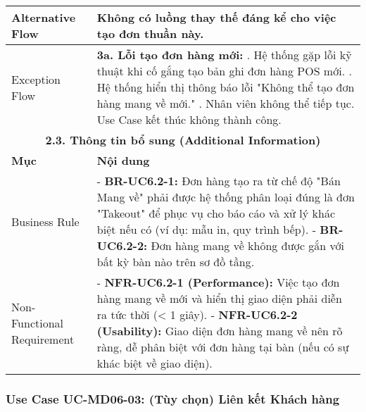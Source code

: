 \begin{longtable}{|m{4cm}|p{11cm}|}
\hline
Alternative Flow & Không có luồng thay thế đáng kể cho việc tạo đơn thuần này. \\
\hline
Exception Flow & \textbf{3a. Lỗi tạo đơn hàng mới:} \newline    1. Hệ thống gặp lỗi kỹ thuật khi cố gắng tạo bản ghi đơn hàng POS mới. \newline    2. Hệ thống hiển thị thông báo lỗi "Không thể tạo đơn hàng mang về mới." \newline    3. Nhân viên không thể tiếp tục. Use Case kết thúc không thành công. \\
\hline
\multicolumn{2}{|c|}{\textbf{2.3. Thông tin bổ sung (Additional Information)}} \\
\hline
\textbf{Mục} & \textbf{Nội dung} \\
\hline
Business Rule & - \textbf{BR-UC6.2-1:} Đơn hàng tạo ra từ chế độ "Bán Mang về" phải được hệ thống phân loại đúng là đơn "Takeout" để phục vụ cho báo cáo và xử lý khác biệt nếu có (ví dụ: mẫu in, quy trình bếp). \newline - \textbf{BR-UC6.2-2:} Đơn hàng mang về không được gắn với bất kỳ bàn nào trên sơ đồ tầng. \\
\hline
Non-Functional Requirement & - \textbf{NFR-UC6.2-1 (Performance):} Việc tạo đơn hàng mang về mới và hiển thị giao diện phải diễn ra tức thời (< 1 giây). \newline - \textbf{NFR-UC6.2-2 (Usability):} Giao diện đơn hàng mang về nên rõ ràng, dễ phân biệt với đơn hàng tại bàn (nếu có sự khác biệt về giao diện). \\
\hline
\end{longtable}

\subsubsection{Use Case UC-MD06-03: (Tùy chọn) Liên kết Khách hàng}

